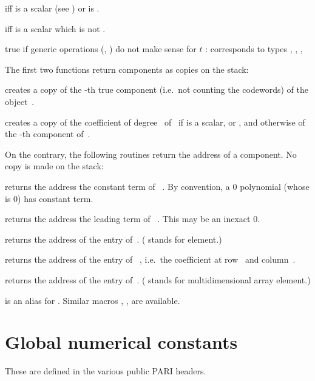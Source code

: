   iff  is a scalar (see
) or  is .

  iff  is a scalar which is not
.

 true if generic operations (,
) do not make sense for $t$ : corresponds to types
, , , 

\label{se:accessors}
The first two functions return  components as copies on the stack:

 creates a copy of the -th true
component (i.e.\ not counting the codewords) of the object~.

 creates a copy of the coefficient of
degree~ of~ if  is a scalar,  or ,
and otherwise of the -th component of~.
\smallskip

\noindent On the contrary, the following routines return the address of a
 component. No copy is made on the stack:

 returns the address the constant term of
~. By convention, a $0$ polynomial (whose  is $0$)
has  constant term.

 returns the address the leading term of
~. This may be an inexact $0$.

 returns the address of the
 entry of~. ( stands for element.)

 returns the address of the
 entry of ~, i.e.~the coefficient at row~
and column~.

 returns the address of the
 entry of~. ( stands for multidimensional array
element.)

 is an alias for .
Similar macros , ,  are available.

\section{Global numerical constants}
These are defined in the various public PARI headers.

